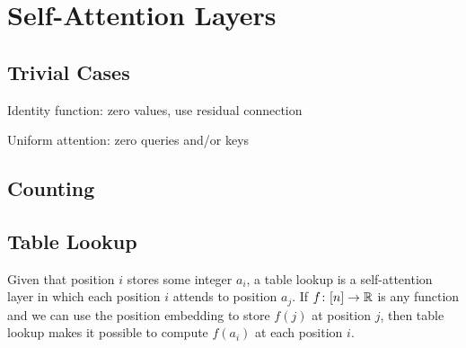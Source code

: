 %
\chapter{Self-Attention Layers}
%

\section{Trivial Cases}

Identity function: zero values, use residual connection

Uniform attention: zero queries and/or keys

\section{Counting}
\label{sec:attn_counting}

\section{Table Lookup}

Given that position $i$ stores some integer $a_i$, a table lookup is a self-attention layer in which each position $i$ attends to position $a_j$. 
If $f \colon [n] \to \mathbb{R}$ is any function and we can use the position embedding to store $f(j)$ at position $j$, then table lookup makes it possible to compute $f(a_i)$ at each position $i$.

\iffalse
\subsection{Single query}

If every position has the same query ($q^{(i)} = q$ for all $i$) and there is a minimum distance $\delta$ between all keys ($|k^{(i)}-k^{(j)}| \ge \delta$ for all $i,j$), then we can just use a FFNN to compute $\mathbb{I}[k^{(i)} = q^{(i)}] \delta$, which is piecewise linear \citep{chiang-cholak-2022-parity}:
\begin{center}
  \begin{tikzpicture}
    \begin{axis}[xtick={-1,0,1},xticklabels={$-\delta$,$0$,$\delta$,ytick={0,1},yticklabels={$0$,$\delta$}}}]
      \addplot[mark=none] coordinates { (-5,0) (-1,0) (0,1) (1,0) (5,0) };
    \end{axis}
  \end{tikzpicture}
\end{center}
(Since this doesn't use attention, it doesn't strictly belong in this chapter.)
\fi

